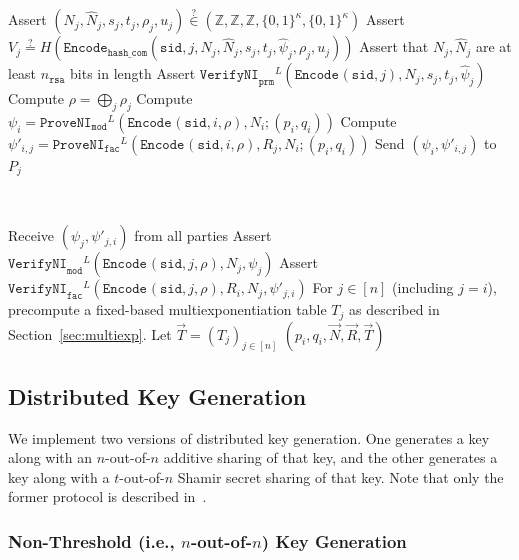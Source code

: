 \documentclass[11pt]{article}
\newcommand{\sid}{\ensuremath{\mathtt{sid}}}
\newcommand{\rsa}{\ensuremath{\mathtt{rsa}}}
\newcommand{\proveni}[1]{\ensuremath{\mathtt{ProveNI}_{\mathtt{#1}}}}
\newcommand{\verifyni}[1]{\ensuremath{\mathtt{VerifyNI}_{\mathtt{#1}}}}
\newcommand{\Encode}[1][]{\ensuremath{\mathtt{Encode}_{\mathtt{#1}}}}
\newcommand{\Z}{\mathbb{Z}}
\newcommand{\?}[1]{\stackrel{?}{#1}}
\newcommand{\Bit}{\ensuremath{\{0{,}1\}}}
\begin{document}
\begin{description}
\begin{algorithmic}[1]
            \State Assert $(N_j, \hat N_j, s_j, t_j, \rho_j, u_j) \? \in
                (\Z, \Z, \Z, \Bit^\kappa, \Bit^\kappa)$
            \State Assert $V_j \? =
                H(\Encode[hash\_com](\sid, j, N_j, \hat N_j, s_j, t_j, \hat{\psi}_j, \rho_j, u_j))$
            \State Assert that $N_j, \hat N_j$ are at least $n_\rsa$ bits in length
            \State Assert $\verifyni{prm}^L(\Encode(\sid, j), \hat N_j, s_j, t_j, \hat{\psi}_j)$
        \EndFor
        \State Compute $\rho=\bigoplus_j \rho_j$
        \State Compute $\psi_i = \proveni{mod}^L(\Encode(\sid, i, \rho), N_i; (p_i, q_i))$
            \State Compute $\psi'_{i,j} = \proveni{fac}^{L}(\Encode(\sid, i, \rho), R_j, N_i; (p_i, q_i))$
            \State Send $(\psi_i, \psi'_{i,j})$ to $P_j$
        \EndFor
    \end{algorithmic}


    \item[\textbf{Output.}] \

    \begin{algorithmic}[1]
        \State Receive $(\psi_j, \psi'_{j,i})$ from all parties
            \State Assert $\verifyni{mod}^L(\Encode(\sid, j, \rho), N_j, \psi_j)$
            \State Assert $\verifyni{fac}^{L}(\Encode(\sid, j, \rho), R_i, N_j, \psi'_{j,i})$
        \EndFor
        \State For $j \in [n]$ (including $j=i$), precompute a fixed-based multiexponentiation table $T_j$ as described in Section~\ref{sec:multiexp}. Let $\vec{T} = (T_j)_{j \in [n]}$
        \State \Return $(p_i, q_i, \vec N, \vec{R}, \vec{T})$
    \end{algorithmic}

\end{description}


\subsection{Distributed Key Generation}
We implement two versions of distributed key generation. One generates a key along with an $n$-out-of-$n$ additive sharing of that key, and the other generates a key along with a $t$-out-of-$n$ Shamir secret sharing of that key. Note that only the former protocol is described in~\cite{cggmp24}.

\subsubsection{Non-Threshold (i.e., $n$-out-of-$n$) Key Generation}
\label{sec:n-of-n-dkg}
\end{document}
